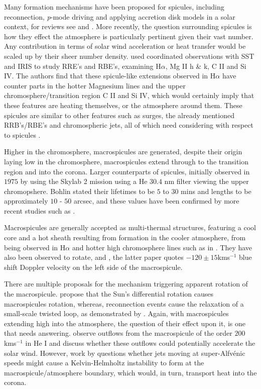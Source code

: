 Many formation mechanisms have been proposed for spicules, including reconnection, \emph{p}-mode driving and applying accretion disk models in a solar context, for reviews see \cite{Sterling2000} and \cite{Zaqara_Erdelyi2009}.
More recently, the question surrounding spicules is how they effect the atmosphere is particularly pertinent given their vast number. 
Any contribution in terms of solar wind acceleration or heat transfer would be scaled up by their sheer number density.
\cite{Rouppe2015} used coordinated observations with SST and IRIS to study RRE's and RBE's, examining H$\alpha$, Mg II h \& k, C II and Si IV.
The authors find that these spicule-like extensions observed in H$\alpha$ have counter parts in the hotter Magnesium lines and the upper chromosphere/transition region C II and Si IV, which would certainly imply that these features are heating themselves, or the atmosphere around them.
These spicules are similar to other features such as surges, the already mentioned RRB's/RBE's and chromospheric jets, all of which need considering with respect to spicules \cite{Tsiropoula2012,Kuridze2015}.


Higher in the chromosphere, macrospicules are generated, despite their origin laying low in the chromosphere, macrospicules extend through to the transition region and into the corona. 
Larger counterparts of spicules, initially observed in $1975$ by \cite{Bohlin1975} using the Skylab 2 mission using a He $30.4$ nm filter viewing the upper chromopshere.
Bohlin stated their lifetimes to be $5$ to $30$ mins and lengths to be approximately $10$ - $50$ arcsec, and these values have been confirmed by more recent studies such as \cite{Bennett2015}.

Macrospicules are generally accepted as multi-thermal structures, featuring a cool core and a hot sheath resulting from formation in the cooler atmosphere, from being observed in H$\alpha$ \citep{LaBonte79} and hotter high chromosphere lines such as in \cite{Parenti2002}.
They have also been observed to rotate, \cite{Pike_Mason1998} and \cite{Kamio2010}, the latter paper quotes $-120 \pm 15$kms$^{-1}$ blue shift Doppler velocity on the left side of the macrospicule. 

There are multiple proposals for the mechanism triggering apparent rotation of the macrospicule. 
\cite{Curdt2011} propose that the Sun's differential rotation causes macrospicules rotation, whereas, reconnection events cause the relaxation of a small-scale twisted loop, as demonstrated by \cite{Adams2014}.
Again, with macrospicules extending high into the atmosphere, the question of their effect upon it, is one that needs answering.
\cite{Pike_Harrison1997} observe outflows from the macrospicule of the order $200$ kms$^{-1}$ in He I and discuss whether these outflows could potentially accelerate the solar wind.
However, work by \cite{Zaqarashvili2014} questions whether jets moving at super-Alfv{\'e}nic speeds might cause a Kelvin-Helmholtz instability to form at the macrospicule/atmosphere boundary, which would, in turn, transport heat into the corona.

